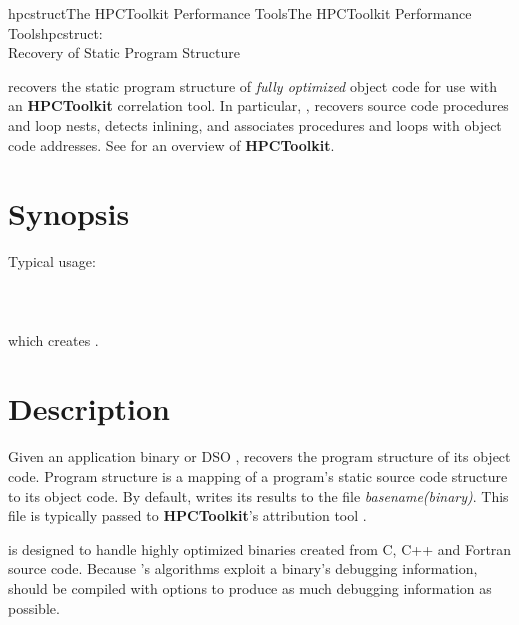 \documentclass[english]{article}
\begin{document}
\begin{Name}{1}{hpcstruct}{The HPCToolkit Performance Tools}{The HPCToolkit Performance Tools}{hpcstruct:\\ Recovery of Static Program Structure}

 recovers the static program structure of \emph{fully optimized} object code for use with an \textbf{HPCToolkit} correlation tool.
In particular, , recovers source code procedures and loop nests, detects inlining, and associates procedures and loops with object code addresses.
See  for an overview of \textbf{HPCToolkit}.

\end{Name}

\section{Synopsis}

  

Typical usage:\\ \\
\SP\SP\SP{}  \\ \\
which creates .

\section{Description}

Given an application binary or DSO ,
 recovers the program structure of its object code.
Program structure is a mapping of a program's static source code structure to its object code.
By default,  writes its results to the file \emph{basename(binary)}.
This file is typically passed to \textbf{HPCToolkit}'s attribution tool .

 is designed to handle highly optimized binaries created from C, C++ and Fortran source code.
Because 's algorithms exploit a binary's debugging information,
 should be compiled with options to produce as much debugging information as possible.

\end{document}
